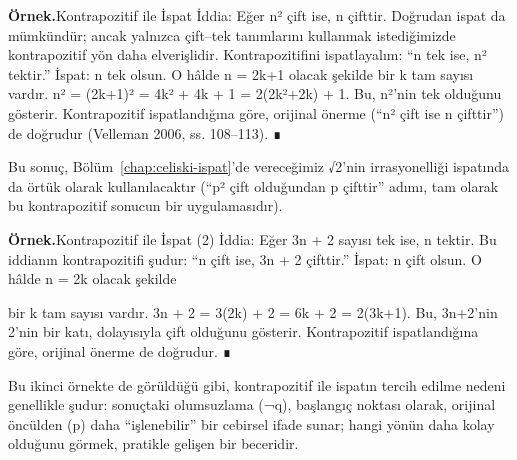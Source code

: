 \begin{tcolorbox}[bookbox,colback=cEx]\textbf{\textsf{\textcolor{cAcc}{Örnek.}}}\quad Kontrapozitif ile İspat İddia: Eğer n² çift ise, n çifttir. Doğrudan ispat da mümkündür; ancak yalnızca çift–tek tanımlarını kullanmak istediğimizde kontrapozitif yön daha elverişlidir. Kontrapozitifini ispatlayalım: “n tek ise, n² tektir.” İspat: n tek olsun. O hâlde n = 2k+1 olacak şekilde bir k tam sayısı vardır. n² = (2k+1)² = 4k² + 4k + 1 = 2(2k²+2k) + 1. Bu, n²’nin tek olduğunu gösterir. Kontrapozitif ispatlandığına göre, orijinal önerme (“n² çift ise n çifttir”) de doğrudur (Velleman 2006, ss. 108–113). ∎\end{tcolorbox}

Bu sonuç, Bölüm~\ref{chap:celiski-ispat}’de vereceğimiz √2’nin irrasyonelliği ispatında da örtük olarak kullanılacaktır (“p² çift olduğundan p çifttir” adımı, tam olarak bu kontrapozitif sonucun bir uygulamasıdır).

\begin{tcolorbox}[bookbox,colback=cEx]\textbf{\textsf{\textcolor{cAcc}{Örnek.}}}\quad Kontrapozitif ile İspat (2) İddia: Eğer 3n + 2 sayısı tek ise, n tektir. Bu iddianın kontrapozitifi şudur: “n çift ise, 3n + 2 çifttir.” İspat: n çift olsun. O hâlde n = 2k olacak şekilde\end{tcolorbox}

bir k tam sayısı vardır. 3n + 2 = 3(2k) + 2 = 6k + 2 = 2(3k+1). Bu, 3n+2’nin 2’nin bir katı, dolayısıyla çift olduğunu gösterir. Kontrapozitif ispatlandığına göre, orijinal önerme de doğrudur. ∎

Bu ikinci örnekte de görüldüğü gibi, kontrapozitif ile ispatın tercih edilme nedeni genellikle şudur: sonuçtaki olumsuzlama (¬q), başlangıç noktası olarak, orijinal öncülden (p) daha “işlenebilir” bir cebirsel ifade sunar; hangi yönün daha kolay olduğunu görmek, pratikle gelişen bir beceridir.

\clearpage

\clearpage